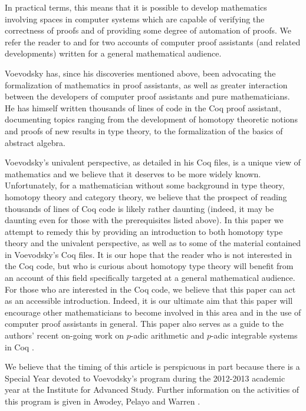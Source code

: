 \documentclass{amsart}
\theoremstyle{definition}
\theoremstyle{remark}
\numberwithin{equation}{section}
\begin{document}
In practical terms, this means that it is possible to
develop mathematics involving spaces in computer systems which are
capable of verifying the correctness of proofs and of providing some
degree of automation of proofs.  We refer the reader to
\cite{Simpson:2004bt} and \cite{Hales:2008ud} for two accounts of
computer proof assistants (and related developments) written for a
general mathematical audience.  

Voevodsky has, since his discoveries mentioned above, been advocating
the formalization of mathematics in proof assistants, as well as
greater interaction between the developers of computer proof
assistants and pure mathematicians. He has himself written thousands
of lines of code in the Coq proof assistant, documenting topics
ranging from the development of homotopy theoretic notions and proofs
of new results in type theory, to the formalization of the basics of
abstract algebra.

Voevodsky's univalent perspective, as detailed in his Coq files, is a
unique view of mathematics and we believe that it deserves to be more widely known.
Unfortunately, for a mathematician without some background in type
theory, homotopy theory and category theory, we believe that the
prospect of reading thousands of lines of Coq code is likely rather
daunting (indeed, it may be daunting even for those with the
prerequisites listed above).  In this paper we attempt to
remedy this by providing an introduction to both homotopy type theory
and the univalent perspective, as well as to some of the material contained
in Voevodsky's Coq files.  It is our hope that the reader who is not
interested in the Coq code, but who is curious about homotopy type
theory will benefit from an account of this field specifically
targeted at a general mathematical audience.  For those who are
interested in the Coq code, we believe that this paper can act as an
accessible introduction.  Indeed, it is our ultimate aim that this
paper will encourage other mathematicians to become involved
in this area and in the use of computer proof assistants in general.
This paper also serves as a guide to the  authors' recent on-going
work on $p$-adic arithmetic and $p$-adic integrable systems in Coq
\cite{PeVoWa2012}.

We believe that the timing of this article is perspicuous in part
because there is a Special Year devoted to Voevodsky's program
during the 2012-2013 academic year at the Institute for Advanced
Study. Further information on the activities of this program is
given in  Awodey, Pelayo and Warren \cite{AwPeWa2012}.
\end{document}
